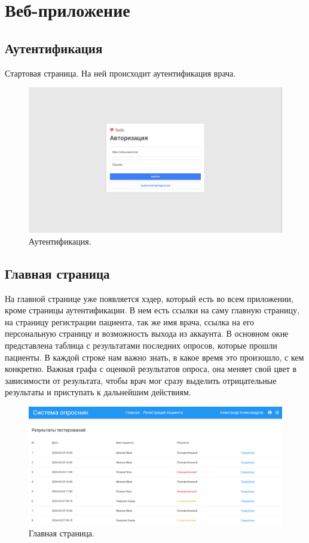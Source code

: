 \section{Веб-приложение}\label{sec:-2}

\subsection{Аутентификация}\label{subsec:}
Стартовая страница.
На ней происходит аутентификация врача.
\begin{figure}[h]
    \includegraphics[scale=0.25]{images/screenshots/auth}
    \caption{Аутентификация.}\label{fig:figure4}
\end{figure}

\subsection{Главная страница}\label{subsec:-2}
На главной странице уже появляется хэдер, который есть во всем приложении, кроме страницы аутентификации.
В нем есть ссылки на саму главную страницу, на страницу регистрации пациента, так же имя врача, ссылка на его персональную страницу и возможность выхода из аккаунта.
В основном окне представлена таблица с результатами последних опросов, которые прошли пациенты.
В каждой строке нам важно знать, в какое время это произошло, с кем конкретно.
Важная графа с оценкой результатов опроса, она меняет свой цвет в зависимости от результата, чтобы врач мог сразу выделить отрицательные результаты и приступать к дальнейшим действиям.
\begin{figure}[ht]
    \includegraphics[scale=0.17]{images/screenshots/main_page}
    \caption{Главная страница.}\label{fig:figure5}
\end{figure}

